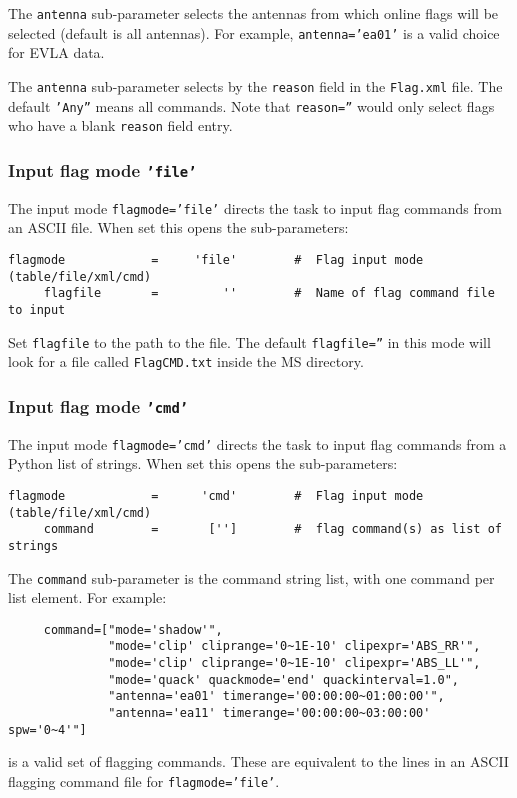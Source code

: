 The {\tt antenna} sub-parameter selects the antennas from which
online flags will be selected (default is all antennas).  For example,
{\tt antenna='ea01'} is a valid choice for EVLA data.

The {\tt antenna} sub-parameter selects by the {\tt reason} field in
the {\tt Flag.xml} file.  The default {\tt 'Any''} means all commands.
Note that {\tt reason=''} would only select flags who have a blank {\tt reason}
field entry.

\subsubsection{Input flag mode {\tt 'file'}}
\label{section:edit.flagcmd.flagmode.file}

The input mode {\tt flagmode='file'} directs the
task to input flag commands from an ASCII file.  
When set this opens the sub-parameters:
\small
\begin{verbatim}
flagmode            =     'file'        #  Flag input mode (table/file/xml/cmd)
     flagfile       =         ''        #  Name of flag command file to input
\end{verbatim}
\normalsize
Set {\tt flagfile} to the path to the file.  The default 
{\tt flagfile=''} in this mode will look for a file called 
{\tt FlagCMD.txt} inside the MS directory.

\subsubsection{Input flag mode {\tt 'cmd'}}
\label{section:edit.flagcmd.flagmode.cmd}

The input mode {\tt flagmode='cmd'} directs the
task to input flag commands from a Python list of strings. 
When set this opens the sub-parameters:
\small
\begin{verbatim}
flagmode            =      'cmd'        #  Flag input mode (table/file/xml/cmd)
     command        =       ['']        #  flag command(s) as list of strings
\end{verbatim}
\normalsize
The {\tt command} sub-parameter is the command string list, with one
command per list element.  For example:
\small
\begin{verbatim}
     command=["mode='shadow'",
              "mode='clip' cliprange='0~1E-10' clipexpr='ABS_RR'",
              "mode='clip' cliprange='0~1E-10' clipexpr='ABS_LL'",
              "mode='quack' quackmode='end' quackinterval=1.0",
              "antenna='ea01' timerange='00:00:00~01:00:00'",
              "antenna='ea11' timerange='00:00:00~03:00:00' spw='0~4'"]
\end{verbatim}
\normalsize
is a valid set of flagging commands.  These are equivalent to the
lines in an ASCII flagging command file for {\tt flagmode='file'}.

